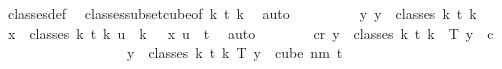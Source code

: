 \begin{isabellebody}
\ classes{\isacharunderscore}{\kern0pt}def\ \isamarkupfalse%
\ classes{\isacharunderscore}{\kern0pt}subset{\isacharunderscore}{\kern0pt}cube{\isacharbrackleft}{\kern0pt}of\ {\isachardoublequoteopen}k{\isacharplus}{\kern0pt}{}{\isachardoublequoteclose}\ t\ {\isachardoublequoteopen}k{\isacharplus}{\kern0pt}{}{\isachardoublequoteclose}{\isacharbrackright}{\kern0pt}\ \isamarkupfalse%
\ auto\isanewline
\ \ \ \ \ \ \isamarkupfalse%
\ \isamarkupfalse%
\ {\isachardoublequoteopen}{\isasymexists}{\isacharbang}{\kern0pt}y{\isachardot}{\kern0pt}\ y\ {\isasymin}\ classes\ {\isacharparenleft}{\kern0pt}k{\isacharplus}{\kern0pt}{}{\isacharparenright}{\kern0pt}\ t\ {\isacharparenleft}{\kern0pt}k{\isacharplus}{\kern0pt}{}{\isacharparenright}{\kern0pt}{\isachardoublequoteclose}\ \isamarkupfalse%
\ {\isacartoucheopen}{\isasymforall}x\ {\isasymin}\ classes\ {\isacharparenleft}{\kern0pt}k{\isacharplus}{\kern0pt}{}{\isacharparenright}{\kern0pt}\ t\ {\isacharparenleft}{\kern0pt}k{\isacharplus}{\kern0pt}{}{\isacharparenright}{\kern0pt}{\isachardot}{\kern0pt}\ {\isasymforall}u\ {\isacharless}{\kern0pt}\ k\ {\isacharplus}{\kern0pt}\ {}{\isachardot}{\kern0pt}\ x\ u\ {\isacharequal}{\kern0pt}\ t{\isacartoucheclose}\ \isamarkupfalse%
\ auto\isanewline
\ \ \ \ \ \ \isamarkupfalse%
\ {\isachardoublequoteopen}{\isasymexists}c{\isacharless}{\kern0pt}r{\isachardot}{\kern0pt}\ {\isasymforall}y\ {\isasymin}\ classes\ {\isacharparenleft}{\kern0pt}k{\isacharplus}{\kern0pt}{}{\isacharparenright}{\kern0pt}\ t\ {\isacharparenleft}{\kern0pt}k{\isacharplus}{\kern0pt}{}{\isacharparenright}{\kern0pt}{\isachardot}{\kern0pt}\ {\isasymchi}\ {\isacharparenleft}{\kern0pt}T\ y{\isacharparenright}{\kern0pt}\ {\isacharequal}{\kern0pt}\ c{\isachardoublequoteclose}\ \isanewline
\ \ \ \ \ \ \isamarkupfalse%
\ {\isacharminus}{\kern0pt}\isanewline
\ \ \ \ \ \ \ \ \isamarkupfalse%
\ {\isachardoublequoteopen}{\isasymforall}y\ {\isasymin}\ classes\ {\isacharparenleft}{\kern0pt}k{\isacharplus}{\kern0pt}{}{\isacharparenright}{\kern0pt}\ t\ {\isacharparenleft}{\kern0pt}k{\isacharplus}{\kern0pt}{}{\isacharparenright}{\kern0pt}{\isachardot}{\kern0pt}\ T\ y\ {\isasymin}\ cube\ {\isacharparenleft}{\kern0pt}n{\isacharplus}{\kern0pt}m{\isacharparenright}{\kern0pt}\ {\isacharparenleft}{\kern0pt}t{\isacharplus}{\kern0pt}{}{\isacharparenright}{\kern0pt}{\isachardoublequoteclose}\ \isamarkupfalse%

\end{isabellebody}
